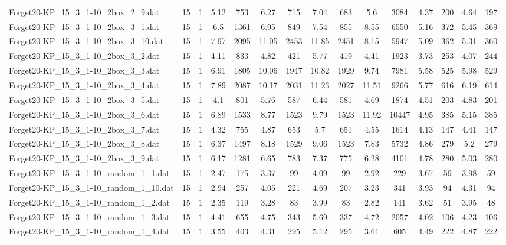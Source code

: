 \begin{table}[!ht]
{\begin{tabular}{lcccccccccccccc}
Forget20-KP\_15\_3\_1-10\_2box\_2\_9.dat & 15 & 1 & 5.12 & 753 & 6.27 & 715 & 7.04 & 683 & 5.6 & 3084 & 4.37 & 200 & 4.64 & 197 \\
Forget20-KP\_15\_3\_1-10\_2box\_3\_1.dat & 15 & 1 & 6.5 & 1361 & 6.95 & 849 & 7.54 & 855 & 8.55 & 6550 & 5.16 & 372 & 5.45 & 369 \\
Forget20-KP\_15\_3\_1-10\_2box\_3\_10.dat & 15 & 1 & 7.97 & 2095 & 11.05 & 2453 & 11.85 & 2451 & 8.15 & 5947 & 5.09 & 362 & 5.31 & 360 \\
Forget20-KP\_15\_3\_1-10\_2box\_3\_2.dat & 15 & 1 & 4.11 & 833 & 4.82 & 421 & 5.77 & 419 & 4.41 & 1923 & 3.73 & 253 & 4.07 & 244 \\
Forget20-KP\_15\_3\_1-10\_2box\_3\_3.dat & 15 & 1 & 6.91 & 1805 & 10.06 & 1947 & 10.82 & 1929 & 9.74 & 7981 & 5.58 & 525 & 5.98 & 529 \\
Forget20-KP\_15\_3\_1-10\_2box\_3\_4.dat & 15 & 1 & 7.89 & 2087 & 10.17 & 2031 & 11.23 & 2027 & 11.51 & 9266 & 5.77 & 616 & 6.19 & 614 \\
Forget20-KP\_15\_3\_1-10\_2box\_3\_5.dat & 15 & 1 & 4.1 & 801 & 5.76 & 587 & 6.44 & 581 & 4.69 & 1874 & 4.51 & 203 & 4.83 & 201 \\
Forget20-KP\_15\_3\_1-10\_2box\_3\_6.dat & 15 & 1 & 6.89 & 1533 & 8.77 & 1523 & 9.79 & 1523 & 11.92 & 10447 & 4.95 & 385 & 5.15 & 385 \\
Forget20-KP\_15\_3\_1-10\_2box\_3\_7.dat & 15 & 1 & 4.32 & 755 & 4.87 & 653 & 5.7 & 651 & 4.55 & 1614 & 4.13 & 147 & 4.41 & 147 \\
Forget20-KP\_15\_3\_1-10\_2box\_3\_8.dat & 15 & 1 & 6.37 & 1497 & 8.18 & 1529 & 9.06 & 1523 & 7.83 & 5732 & 4.86 & 279 & 5.2 & 279 \\
Forget20-KP\_15\_3\_1-10\_2box\_3\_9.dat & 15 & 1 & 6.17 & 1281 & 6.65 & 783 & 7.37 & 775 & 6.28 & 4101 & 4.78 & 280 & 5.03 & 280 \\
Forget20-KP\_15\_3\_1-10\_random\_1\_1.dat & 15 & 1 & 2.47 & 175 & 3.37 & 99 & 4.09 & 99 & 2.92 & 229 & 3.67 & 59 & 3.98 & 59 \\
Forget20-KP\_15\_3\_1-10\_random\_1\_10.dat & 15 & 1 & 2.94 & 257 & 4.05 & 221 & 4.69 & 207 & 3.23 & 341 & 3.93 & 94 & 4.31 & 94 \\
Forget20-KP\_15\_3\_1-10\_random\_1\_2.dat & 15 & 1 & 2.35 & 119 & 3.28 & 83 & 3.99 & 83 & 2.82 & 141 & 3.62 & 51 & 3.95 & 48 \\
Forget20-KP\_15\_3\_1-10\_random\_1\_3.dat & 15 & 1 & 4.41 & 655 & 4.75 & 343 & 5.69 & 337 & 4.72 & 2057 & 4.02 & 106 & 4.23 & 106 \\
Forget20-KP\_15\_3\_1-10\_random\_1\_4.dat & 15 & 1 & 3.55 & 403 & 4.31 & 295 & 5.12 & 295 & 3.61 & 605 & 4.49 & 222 & 4.87 & 222 \\

\end{tabular}}
\end{table}
